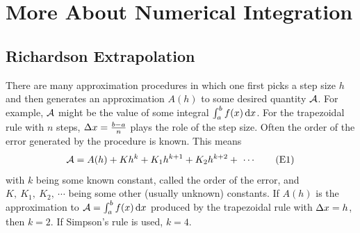 
\graphicspath{{figures/richardson/}}


\chapter{More About Numerical Integration}\label{ap:RichardsonRomberg}

 
\section{Richardson Extrapolation}
There are many approximation procedures in which one first picks a
step size $h$ and then generates an approximation $A(h)$ to some
desired quantity $\mathcal{A}$. For example, $\mathcal{A}$ might be the value of
some integral $\int_a^b f(x)\,\mathrm{d}x$. For the trapezoidal rule with $n$ steps,
$\Delta x=\tfrac{b-a}{n}$ plays the role of the step size.
Often the order of the error generated by the procedure is known. This means
\begin{equation*}
\mathcal{A}=A(h)+Kh^k+K_1h^{k+1}+K_2h^{k+2}+\ \cdots
\tag{E1}\end{equation*}
with $k$ being some known constant, called the order of the error, and $K,\ 
K_1,\ K_2,\ \cdots$ being some other
(usually unknown) constants.  If $A(h)$ is the approximation to 
$\mathcal{A}=\int_a^b f(x)\,\mathrm{d}x$ produced by the trapezoidal rule with $\Delta x=h$, 
then $k=2$. If Simpson's rule is used, $k=4$.


